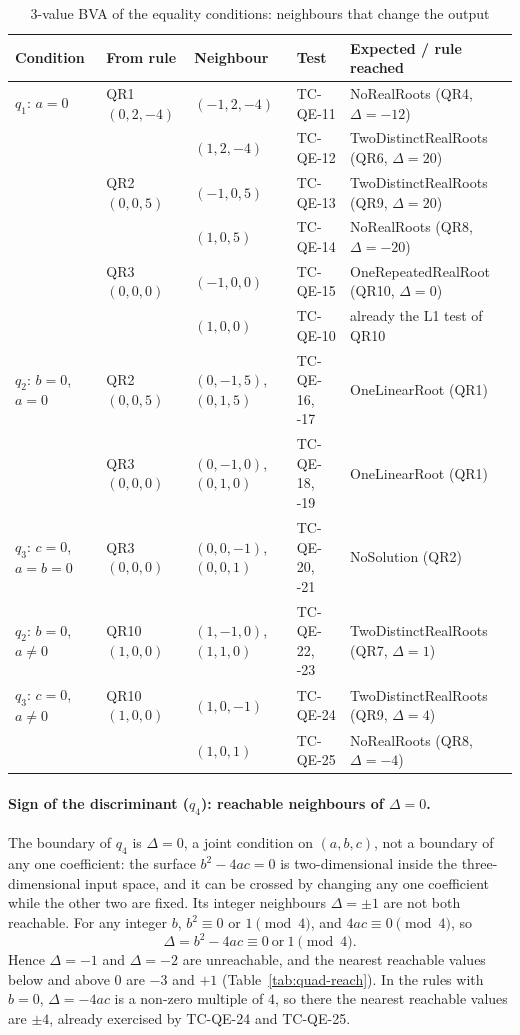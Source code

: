 \documentclass[11pt,a4paper]{article}
\begin{document}
\begin{table}[H]
\centering
\caption{3-value BVA of the equality conditions: neighbours that change the output}
\label{tab:quad-eq-bva}
\small
\begin{tabularx}{\textwidth}{l l l l Y}
\toprule
Condition & From rule & Neighbour & Test & Expected / rule reached \\
\midrule
\(q_1\): \(a=0\) & QR1 \((0,2,-4)\) & \((-1,2,-4)\) & TC-QE-11 & NoRealRoots (QR4, \(\Delta=-12\)) \\
 & & \((1,2,-4)\) & TC-QE-12 & TwoDistinctRealRoots (QR6, \(\Delta=20\)) \\
 & QR2 \((0,0,5)\) & \((-1,0,5)\) & TC-QE-13 & TwoDistinctRealRoots (QR9, \(\Delta=20\)) \\
 & & \((1,0,5)\) & TC-QE-14 & NoRealRoots (QR8, \(\Delta=-20\)) \\
 & QR3 \((0,0,0)\) & \((-1,0,0)\) & TC-QE-15 & OneRepeatedRealRoot (QR10, \(\Delta=0\)) \\
 & & \((1,0,0)\) & TC-QE-10 & already the L1 test of QR10 \\
\(q_2\): \(b=0\), \(a=0\) & QR2 \((0,0,5)\) & \((0,-1,5)\), \((0,1,5)\) & TC-QE-16, -17 & OneLinearRoot (QR1) \\
 & QR3 \((0,0,0)\) & \((0,-1,0)\), \((0,1,0)\) & TC-QE-18, -19 & OneLinearRoot (QR1) \\
\(q_3\): \(c=0\), \(a=b=0\) & QR3 \((0,0,0)\) & \((0,0,-1)\), \((0,0,1)\) & TC-QE-20, -21 & NoSolution (QR2) \\
\(q_2\): \(b=0\), \(a\ne0\) & QR10 \((1,0,0)\) & \((1,-1,0)\), \((1,1,0)\) & TC-QE-22, -23 & TwoDistinctRealRoots (QR7, \(\Delta=1\)) \\
\(q_3\): \(c=0\), \(a\ne0\) & QR10 \((1,0,0)\) & \((1,0,-1)\) & TC-QE-24 & TwoDistinctRealRoots (QR9, \(\Delta=4\)) \\
 & & \((1,0,1)\) & TC-QE-25 & NoRealRoots (QR8, \(\Delta=-4\)) \\
\bottomrule
\end{tabularx}
\end{table}

\paragraph{Sign of the discriminant (\(q_4\)): reachable neighbours of
\(\Delta=0\).} The boundary of \(q_4\) is \(\Delta=0\), a joint condition on
\((a,b,c)\), not a boundary of any one coefficient: the surface
\(b^2-4ac=0\) is two-dimensional inside the three-dimensional input space,
and it can be crossed by changing any one coefficient while the other two
are fixed. Its integer neighbours \(\Delta=\pm1\) are not both reachable.
For any integer \(b\), \(b^2\equiv0\) or \(1\pmod 4\), and \(4ac\equiv0\pmod
4\), so
\[
\Delta=b^2-4ac\equiv 0\ \text{or}\ 1 \pmod 4 .
\]
Hence \(\Delta=-1\) and \(\Delta=-2\) are unreachable, and the nearest
reachable values below and above \(0\) are \(-3\) and \(+1\)
(Table~\ref{tab:quad-reach}). In the rules with \(b=0\), \(\Delta=-4ac\) is
a non-zero multiple of \(4\), so there the nearest reachable values are
\(\pm4\), already exercised by TC-QE-24 and TC-QE-25.
\end{document}
